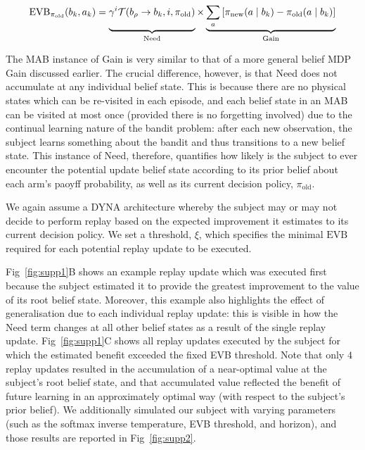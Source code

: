 \begin{equation}
    \text{EVB}_{\pi_{\text{old}}}(b_k, a_k) = \underbrace{\vphantom{\sum_a}\gamma^i \mathcal{T}(b_\rho \rightarrow b_k, i, \pi_{\text{old}})}_{\text{Need}} \times \underbrace{\sum_{a} \left[\pi_{\text{new}}(a\mid b_k) - \pi_{\text{old}}(a\mid b_k) \right]}_{\text{Gain}}
    \label{eqn:banditevb}
\end{equation}

The MAB instance of Gain is very similar to that of a more general belief MDP Gain discussed earlier. The crucial difference, however, is that Need does not accumulate at any individual belief state. This is because there are no physical states which can be re-visited in each episode, and each belief state in an MAB can be visited at most once (provided there is no forgetting involved) due to the continual learning nature of the bandit problem: after each new observation, the subject learns something about the bandit and thus transitions to a new belief state. This instance of Need, therefore, quantifies how likely is the subject to ever encounter the potential update belief state according to its prior belief about each arm's paoyff probability, as well as its current decision policy, $\pi_{\text{old}}$.

We again assume a DYNA architecture whereby the subject may or may not decide to perform replay based on the expected improvement it estimates to its current decision policy. We set a threshold, $\xi$, which specifies the minimal $\text{EVB}$ required for each potential replay update to be executed.

Fig~\ref{fig:supp1}B shows an example replay update which was executed first because the subject estimated it to provide the greatest improvement to the value of its root belief state. Moreover, this example also highlights the effect of generalisation due to each individual replay update: this is visible in how the Need term changes at all other belief states as a result of the single replay update. Fig~\ref{fig:supp1}C shows all replay updates executed by the subject for which the estimated benefit exceeded the fixed EVB threshold. Note that only $4$ replay updates resulted in the accumulation of a near-optimal value at the subject's root belief state, and that accumulated value reflected the benefit of future learning in an approximately optimal way (with respect to the subject's prior belief). We additionally simulated our subject with varying parameters (such as the softmax inverse temperature, EVB threshold, and horizon), and those results are reported in Fig~\ref{fig:supp2}.

